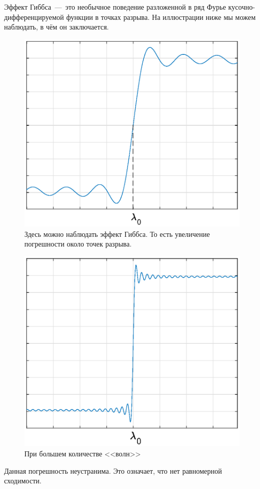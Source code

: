 Эффект Гиббса~---~это необычное поведение разложенной в ряд Фурье кусочно-дифференцируемой функции в точках разрыва. На иллюстрации ниже мы можем наблюдать, в чём он заключается.

\begin{figure}[H]
\begin{center}
\includegraphics[width=0.6\linewidth]{ch8/ch8_fig2.eps}
\caption{Здесь можно наблюдать эффект Гиббса. То есть увеличение погрешности около точек разрыва.}
\label{ch1.fig3}
\end{center}
\end{figure}
\begin{figure}[H]
\begin{center}
\includegraphics[width=0.6\linewidth]{ch8/ch8_fig3.eps}
\caption{При большем количестве <<волн>>}
\label{ch1.fig4}
\end{center}
\end{figure}

Данная погрешность неустранима. Это означает, что нет равномерной сходимости.

